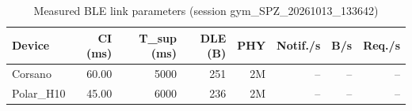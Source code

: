 \begin{table}[t]
\caption{Measured BLE link parameters (session gym_SPZ_20261013_133642)}
\label{tab:link-params}
\centering
\scriptsize
\setlength{\tabcolsep}{3pt}
\begin{tabular}{lrrrrrrr}
\toprule
\textbf{Device} & \textbf{CI (ms)} & \textbf{T_sup (ms)} & \textbf{DLE (B)} & \textbf{PHY} & \textbf{Notif./s} & \textbf{B/s} & \textbf{Req./s} \\
\midrule
Corsano & 60.00 & 5000 & 251 & 2M & -- & -- & -- \\
Polar\_H10 & 45.00 & 6000 & 236 & 2M & -- & -- & -- \\
\bottomrule
\end{tabular}
\end{table}
